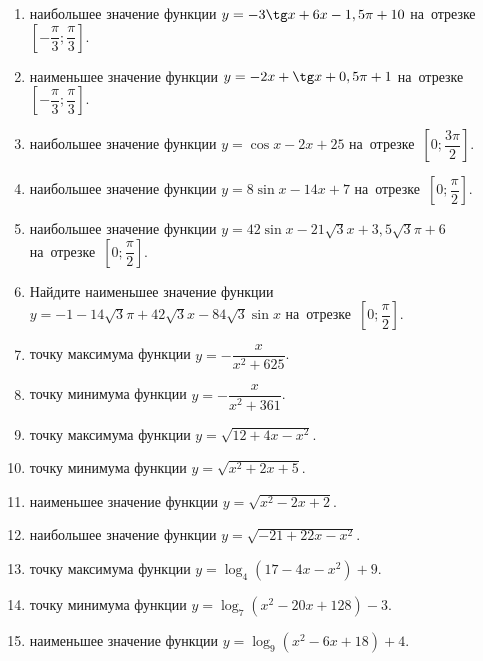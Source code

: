 \documentclass[a4paper,10pt]{article}
\begin{document}
\begin{enumerate}
\item {} наибольшее значение функции $y=-3\tg x +6x-1,5\pi +10$ на~отрезке~$\left[-\dfrac{\pi}{3};\dfrac{\pi}{3}\right]$.

\item {} наименьшее значение функции $y=-2x +\tg x+0,5\pi+1$ на~отрезке~$\left[-\dfrac{\pi}{3};\dfrac{\pi}{3}\right]$.

\item {} наибольшее значение функции $y=\cos x-2x+25$ на~отрезке~$\left[0;\dfrac{3\pi}{2}\right]$.

\item {} наибольшее значение функции $y=8\sin x-14x+7$ на~отрезке~$\left[0;\dfrac{\pi}{2}\right]$.

\item {} наибольшее значение функции $y=42\sin x-21\sqrt{3}x+3,5\sqrt{3}\pi +6$ на~отрезке~$\left[0;\dfrac{\pi}{2}\right]$.

\item Найдите наименьшее значение функции $y=-1-14\sqrt{3}\pi+42\sqrt{3}x-84\sqrt{3}\sin x$ на~отрезке~$\left[0;\dfrac{\pi}{2}\right]$.

\item {} точку максимума функции $y=-\dfrac{x}{ x^2 +625}$.

\item {} точку минимума функции $y=-\dfrac{x}{ x^2 +361}$.

\item {} точку максимума функции $y=\sqrt{12+4x-x^2}$.

\item {} точку минимума функции $y=\sqrt{x^2+2x+5}$.

\item {} наименьшее значение функции $y=\sqrt{x^2-2x+2}$.

\item {} наибольшее значение функции $y=\sqrt{-21+22x-x^2}$.

\item {} точку максимума функции $y=\log_4\left(17-4x-x^2\right)+9$.

\item {} точку минимума функции $y=\log_7\left(x^2-20x+128\right)-3$.

\item {} наименьшее значение функции $y=\log_9\left(x^2-6x+18\right)+4$.


\end{enumerate}
\end{document}
